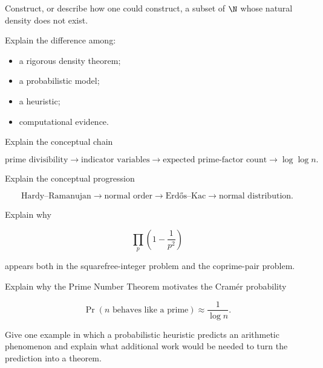 \begin{exercise}[3]
Construct, or describe how one could construct, a subset of \(\N\) whose
natural density does not exist.
\end{exercise}

\begin{exercise}[2]
Explain the difference among:
\begin{itemize}
    \item a rigorous density theorem;
    \item a probabilistic model;
    \item a heuristic;
    \item computational evidence.
\end{itemize}
\end{exercise}

\begin{exercise}[3]
Explain the conceptual chain

\[
\text{prime divisibility}
\longrightarrow
\text{indicator variables}
\longrightarrow
\text{expected prime-factor count}
\longrightarrow
\log\log n.
\]
\end{exercise}

\begin{exercise}[3]
Explain the conceptual progression

\[
\text{Hardy--Ramanujan}
\longrightarrow
\text{normal order}
\longrightarrow
\text{Erdős--Kac}
\longrightarrow
\text{normal distribution}.
\]
\end{exercise}

\begin{exercise}[3]
Explain why

\[
\prod_p\left(1-\frac1{p^2}\right)
\]

appears both in the squarefree-integer problem and the coprime-pair problem.
\end{exercise}

\begin{exercise}[3]
Explain why the Prime Number Theorem motivates the Cramér probability

\[ \Pr(n\text{ behaves like a prime})\approx\frac1{\log n}. \]
\end{exercise}

\begin{exercise}[3]
Give one example in which a probabilistic heuristic predicts an arithmetic
phenomenon and explain what additional work would be needed to turn the
prediction into a theorem.
\end{exercise}

